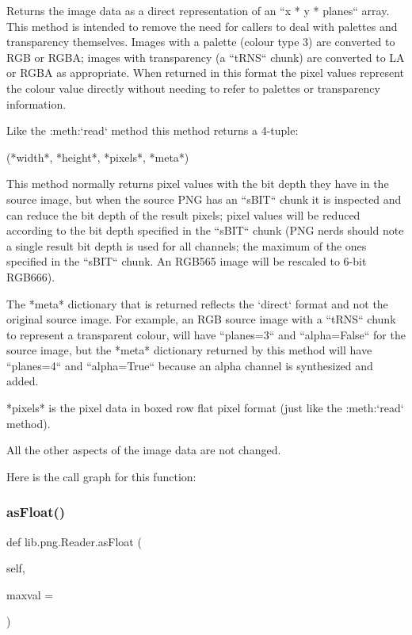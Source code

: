 \begin{DoxyVerb}Returns the image data as a direct representation of an
``x * y * planes`` array.  This method is intended to remove the
need for callers to deal with palettes and transparency
themselves.  Images with a palette (colour type 3)
are converted to RGB or RGBA; images with transparency (a
``tRNS`` chunk) are converted to LA or RGBA as appropriate.
When returned in this format the pixel values represent the
colour value directly without needing to refer to palettes or
transparency information.

Like the :meth:`read` method this method returns a 4-tuple:

(*width*, *height*, *pixels*, *meta*)

This method normally returns pixel values with the bit depth
they have in the source image, but when the source PNG has an
``sBIT`` chunk it is inspected and can reduce the bit depth of
the result pixels; pixel values will be reduced according to
the bit depth specified in the ``sBIT`` chunk (PNG nerds should
note a single result bit depth is used for all channels; the
maximum of the ones specified in the ``sBIT`` chunk.  An RGB565
image will be rescaled to 6-bit RGB666).

The *meta* dictionary that is returned reflects the `direct`
format and not the original source image.  For example, an RGB
source image with a ``tRNS`` chunk to represent a transparent
colour, will have ``planes=3`` and ``alpha=False`` for the
source image, but the *meta* dictionary returned by this method
will have ``planes=4`` and ``alpha=True`` because an alpha
channel is synthesized and added.

*pixels* is the pixel data in boxed row flat pixel format (just
like the :meth:`read` method).

All the other aspects of the image data are not changed.
\end{DoxyVerb}
 Here is the call graph for this function\+:
\mbox{\label{classlib_1_1png_1_1_reader_a096a287be3328813ad533c97b67d99a0}} 
\subsubsection{\texorpdfstring{as\+Float()}{asFloat()}}
{\footnotesize\ttfamily def lib.\+png.\+Reader.\+as\+Float (\begin{DoxyParamCaption}\item[{}]{self,  }\item[{}]{maxval = {} }\end{DoxyParamCaption})}

